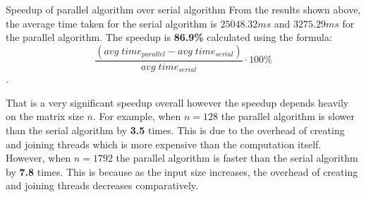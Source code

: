 \documentclass[12pt]{article}
\begin{document}
\begin{section}{Speedup of parallel algorithm over serial algorithm}
 From the results shown above, the average time taken for the serial algorithm is $25048.32ms$  and $3275.29ms$ for the parallel algorithm.
 The speedup is \textbf{86.9\%} calculated using the formula: $$\frac{(avg\;time_{parallel} - avg\;time_{serial})}{avg\;time_{serial}} \cdot 100\%$$.

 That is a very significant speedup overall however the speedup depends heavily on the matrix size $n$. For example, when $n = 128$ the parallel
 algorithm is slower than the serial algorithm by \textbf{3.5} times. This is due to the overhead of creating and joining threads which is more
 expensive than the computation itself. However, when $n = 1792$ the parallel algorithm is faster than the serial algorithm by \textbf{7.8} times. This is
 because as the input size increases, the overhead of creating and joining threads decreases comparatively.
\end{section}
\end{document}
